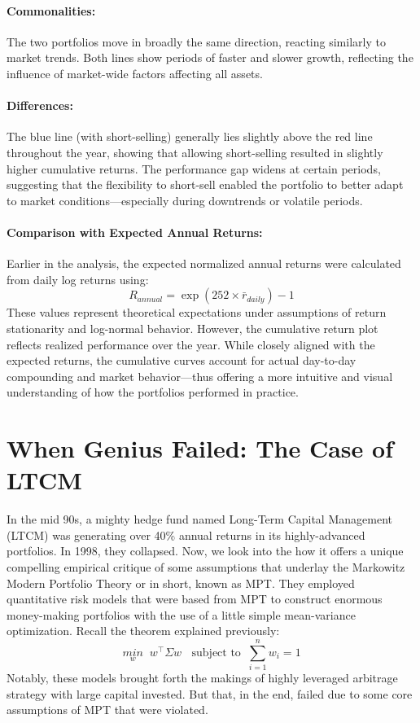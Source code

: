 \documentclass[11pt]{article}
\begin{document}
    \paragraph{Commonalities:}The two portfolios move in broadly the same direction, reacting similarly to market trends. Both lines show periods of faster and slower growth, reflecting the influence of market-wide factors affecting all assets.
    \paragraph{Differences:} The blue line (with short-selling) generally lies slightly above the red line throughout the year, showing that allowing short-selling resulted in slightly higher cumulative returns. The performance gap widens at certain periods, suggesting that the flexibility to short-sell enabled the portfolio to better adapt to market conditions—especially during downtrends or volatile periods.

\paragraph{Comparison with Expected Annual Returns:}
Earlier in the analysis, the expected normalized annual returns were calculated from daily log returns using:
\[R_{annual}=\exp(252\times \bar{r}_{daily})-1\]
These values represent theoretical expectations under assumptions of return stationarity and log-normal behavior. However, the cumulative return plot reflects realized performance over the year. While closely aligned with the expected returns, the cumulative curves account for actual day-to-day compounding and market behavior—thus offering a more intuitive and visual understanding of how the portfolios performed in practice.

\section{When Genius Failed: The Case of LTCM}

    In the mid 90s, a mighty hedge fund named Long-Term Capital Management (LTCM) was generating over 40\% annual returns in its highly-advanced portfolios. In 1998, they collapsed. Now, we look into the how it offers a unique compelling empirical critique of some assumptions that underlay the Markowitz Modern Portfolio Theory or in short, known as MPT. They employed quantitative risk models that were based from MPT to construct enormous money-making portfolios with the use of a little simple mean-variance optimization. Recall the theorem explained previously:
    \begin{equation}
        \underset{w}{min}\;\; w^\intercal\Sigma w\;\;\text{ subject to}\;\; \sum_{i=1}^nw_i = 1
    \end{equation}
    Notably, these models brought forth the makings of highly leveraged arbitrage strategy with large capital invested. But that, in the end, failed due to some core assumptions of MPT that were violated. 
\end{document}
